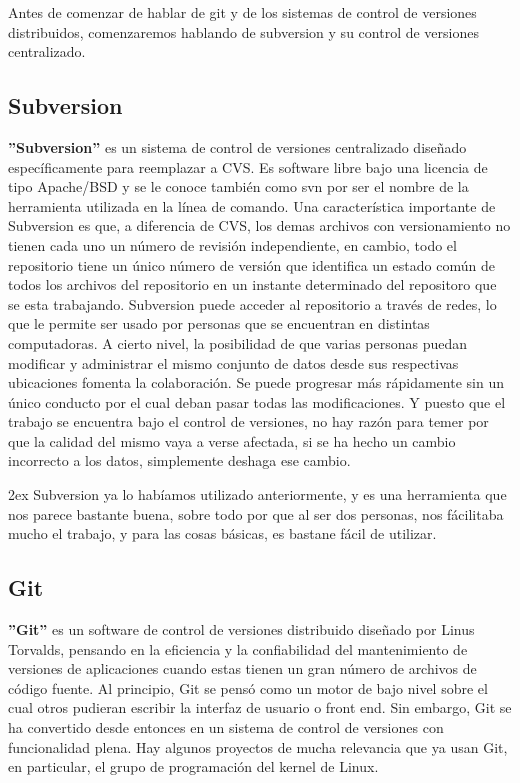 \documentclass[12pt,a4paper]{report}
\begin{document}
Antes de comenzar de hablar de git y de los sistemas de control de versiones
distribuidos, comenzaremos hablando de subversion y su control de versiones
centralizado. 

\subsection{Subversion}

\textbf{''Subversion''} es un sistema de control de versiones centralizado
diseñado
específicamente para reemplazar a CVS. Es software libre bajo una licencia de
tipo Apache/BSD y se le conoce también como svn por ser el nombre de la
herramienta utilizada en la línea de comando.  Una característica importante de
Subversion es que, a diferencia de CVS, los demas archivos con versionamiento no
tienen cada uno un número de revisión independiente, en cambio, todo el
repositorio tiene un único número de versión que identifica un estado común de
todos los archivos del repositorio en un instante determinado del repositoro que
se esta trabajando. Subversion puede acceder al repositorio a través de redes,
lo que le permite ser usado por personas que se encuentran en distintas
computadoras. A cierto nivel, la posibilidad de que varias personas puedan
modificar y administrar el mismo conjunto de datos desde sus respectivas
ubicaciones fomenta la colaboración. Se puede progresar más rápidamente sin un
único conducto por el cual deban pasar todas las modificaciones. Y puesto que el
trabajo se encuentra bajo el control de versiones, no hay razón para temer por
que la calidad del mismo vaya a verse afectada, si se ha hecho un cambio
incorrecto a los datos, simplemente deshaga ese cambio. 

\parskip 2ex Subversion ya lo habíamos utilizado anteriormente, y es una
herramienta que nos parece bastante buena, sobre todo por que al ser dos
personas, nos fácilitaba mucho el trabajo, y para las cosas básicas, es bastane
fácil de utilizar. 


\subsection{Git}

\textbf{''Git''} es un software de control de versiones distribuido diseñado por
Linus Torvalds, pensando en la eficiencia y la confiabilidad del mantenimiento
de versiones de aplicaciones cuando estas tienen un gran número de archivos de
código fuente. Al principio, Git se pensó como un motor de bajo nivel sobre el
cual otros pudieran escribir la interfaz de usuario o front end. Sin embargo,
Git se ha convertido desde entonces en un sistema de control de versiones con
funcionalidad plena. Hay algunos proyectos de mucha relevancia que ya usan Git,
en particular, el grupo de programación del kernel de Linux. 
\end{document}
